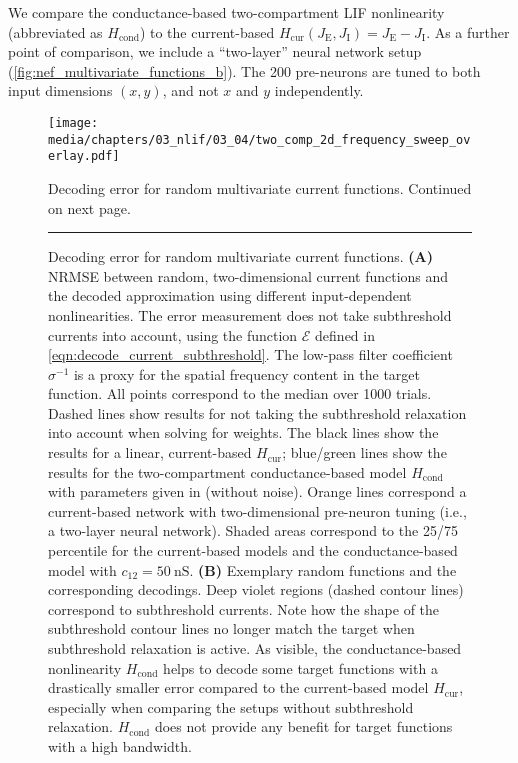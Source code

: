We compare the conductance-based two-compartment LIF nonlinearity (abbreviated as $H_\mathrm{cond}$) to the current-based $H_\mathrm{cur}(J_\mathrm{E}, J_\mathrm{I}) = J_\mathrm{E} - J_\mathrm{I}$.
As a further point of comparison, we include a \enquote{two-layer} neural network setup (\cref{fig:nef_multivariate_functions_b}). The 200 pre-neurons are tuned to both input dimensions $(x, y)$, and not $x$ and $y$ independently.

\begin{figure}[p]
	\centering
	\kern-158.06mm\texttt{[image: media/chapters/03\_nlif/03\_04/two\_comp\_2d\_frequency\_sweep\_overlay.pdf]}
	\begin{subfigure}{0cm}\label{fig:frequency_sweep_a}\end{subfigure}%
	\begin{subfigure}{0cm}\label{fig:frequency_sweep_b}\end{subfigure}%
	\caption[Decoding error for random multivariate current functions]{Decoding error for random multivariate current functions. Continued on next page.}
	\label{fig:two_comp_lif_frequency_sweep}
\end{figure}

\addtocounter{figure}{-1}
\begin{figure}[t]
	\caption[]{Decoding error for random multivariate current functions.
	\textbf{(A)} NRMSE between random, two-dimensional current functions and the decoded approximation using different input-dependent nonlinearities. The error measurement does not take subthreshold currents into account, using the function $\mathcal{E}$ defined in \cref{eqn:decode_current_subthreshold}. The low-pass filter coefficient $\sigma^{-1}$ is a proxy for the spatial frequency content in the target function. All points correspond to the median over \num{1000} trials. Dashed lines show results for not taking the subthreshold relaxation into account when solving for weights. The black lines show the results for a linear, current-based $H_\mathrm{cur}$; blue/green lines show the results for the two-compartment conductance-based model  $H_\mathrm{cond}$ with parameters given in  (without noise). Orange lines correspond a current-based network with two-dimensional pre-neuron tuning (i.e., a two-layer neural network). Shaded areas correspond to the 25/75 percentile for the current-based models and the conductance-based model with $c_{12} = \SI{50}{\nano\siemens}$.
	\textbf{(B)} Exemplary random functions and the corresponding decodings. Deep violet regions (dashed contour lines) correspond to subthreshold currents. Note how the shape of the subthreshold contour lines no longer match the target when subthreshold relaxation is active. As visible, the conductance-based nonlinearity $H_\mathrm{cond}$ helps to decode some target functions with a drastically smaller error compared to the current-based model $H_\mathrm{cur}$, especially when comparing the setups without subthreshold relaxation. $H_\mathrm{cond}$ does not provide any benefit for target functions with a high bandwidth.
	}
	\rule{\columnwidth}{1pt}
\end{figure}

